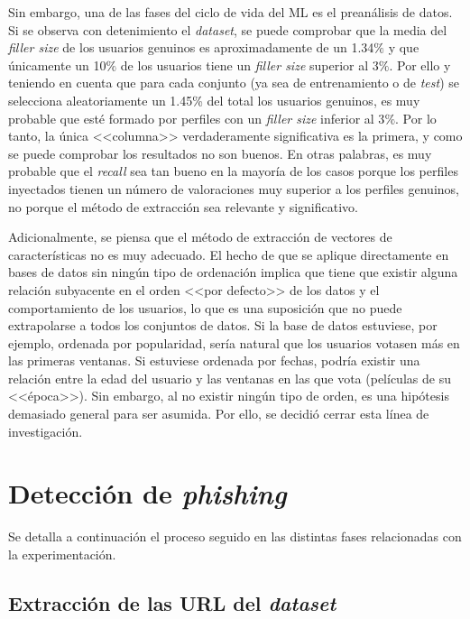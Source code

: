 Sin embargo, una de las fases del ciclo de vida del ML es el preanálisis de datos. Si se observa con detenimiento el \textit{dataset}, se puede comprobar que la media del \textit{filler size} de los usuarios genuinos es aproximadamente de un 1.34$\%$ y que únicamente un 10$\%$ de los usuarios tiene un \textit{filler size} superior al 3$\%$. Por ello y teniendo en cuenta que para cada conjunto (ya sea de entrenamiento o de \textit{test}) se selecciona aleatoriamente un 1.45\% del total los usuarios genuinos, es muy probable que esté formado por perfiles con un \textit{filler size} inferior al 3$\%$. Por lo tanto, la única <<columna>> verdaderamente significativa es la primera, y como se puede comprobar los resultados no son buenos. En otras palabras, es muy probable que el \textit{recall} sea tan bueno en la mayoría de los casos porque los perfiles inyectados tienen un número de valoraciones muy superior a los perfiles genuinos, no porque el método de extracción sea relevante y significativo.

Adicionalmente, se piensa que el método de extracción de vectores de características no es muy adecuado. El hecho de que se aplique directamente en bases de datos sin ningún tipo de ordenación implica que tiene que existir alguna relación subyacente en el orden <<por defecto>> de los datos y el comportamiento de los usuarios, lo que es una suposición que no puede extrapolarse a todos los conjuntos de datos. Si la base de datos estuviese, por ejemplo, ordenada por popularidad, sería natural que los usuarios votasen más en las primeras ventanas. Si estuviese ordenada por fechas, podría existir una relación entre la edad del usuario y las ventanas en las que vota (películas de su <<época>>). Sin embargo, al no existir ningún tipo de orden, es una hipótesis demasiado general para ser asumida. Por ello, se decidió cerrar esta línea de investigación.


\section{Detección de \textit{phishing}}
\label{sec:5_phishing}
Se detalla a continuación el proceso seguido en las distintas fases relacionadas con la experimentación.

\subsection{Extracción de las URL del \textit{dataset}}

